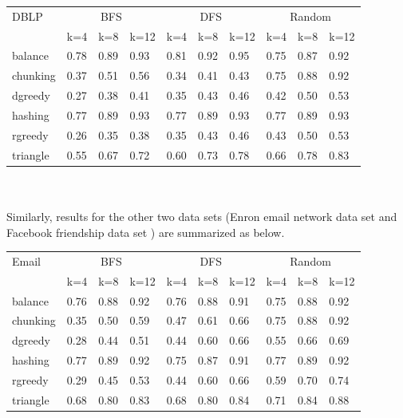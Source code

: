 \documentclass[12pt]{article}
\begin{document}
\begin{tabular}{llllllllll}
\toprule
    DBLP & \multicolumn{3}{c}{BFS} & \multicolumn{3}{c}{DFS} & \multicolumn{3}{c}{Random}\\

    & k=4 & k=8 & k=12
    & k=4 & k=8 & k=12
     & k=4 & k=8 & k=12  \\
    \midrule
    balance &    0.78 	& 0.89 	& 0.93 &	 0.81 &	 0.92 &	 0.95 &	 0.75 &	 0.87 &	 0.92   \\
chunking&	 0.37 &	 0.51 &	 0.56 &	 0.34 &	 0.41 &	 0.43 &	 0.75 &	 0.88 &	 0.92 \\
dgreedy&	 0.27 &	 0.38& 	 0.41 & 	 0.35 & 	 0.43 & 	 0.46 & 	 0.42 &  	 0.50 & 	 0.53 \\
hashing&	 0.77 &	 0.89 & 	 0.93 & 	 0.77 & 	 0.89 & 	 0.93 & 	 0.77 & 	 0.89 & 	 0.93 \\
rgreedy	& 0.26 &	 0.35 & 	 0.38 & 	 0.35 & 	 0.43 & 	 0.46 & 	 0.43 & 	 0.50 & 	 0.53 \\
triangle	 &0.55 &	 0.67 & 	 0.72 & 	 0.60 & 	 0.73 & 	 0.78 & 	 0.66 & 	 0.78 & 	 0.83 \\
    \bottomrule
\end{tabular}
\\
\\

Similarly, results for the other two data sets (Enron email network data set and Facebook friendship data set ) are summarized as below.\\

\begin{tabular}{llllllllll}
\toprule
    Email & \multicolumn{3}{c}{BFS} & \multicolumn{3}{c}{DFS} & \multicolumn{3}{c}{Random}\\

    & k=4 & k=8 & k=12
    & k=4 & k=8 & k=12
     & k=4 & k=8 & k=12  \\
    \midrule
    balance &  0.76 &	 0.88 &	 0.92 &	 0.76 &	 0.88 &	 0.91 &	 0.75 &	 0.88 &	 0.92 \\
chunking&	 0.35 &	 0.50 &	 0.59 &	 0.47 &	 0.61 &	 0.66 &	 0.75 &	 0.88 &	 0.92 \\
dgreedy&	 0.28 &	 0.44 &	 0.51 &	 0.44 &	 0.60 &	 0.66 &	 0.55 &	 0.66 &	 0.69 \\
hashing&	   0.77& 	 0.89 &	 0.92 &	 0.75 &	 0.87 &	 0.91 &	 0.77 &	 0.89 &	 0.92 \\
rgreedy&	   0.29& 	 0.45 &	 0.53 &	 0.44 &	 0.60 &	 0.66 &	 0.59 &	 0.70 &	 0.74 \\
triangle&	   0.68& 	 0.80 &	 0.83 &	 0.68 &	 0.80 &	 0.84 &	 0.71 &	 0.84 &	 0.88 \\
    \bottomrule
\end{tabular}
\end{document}
